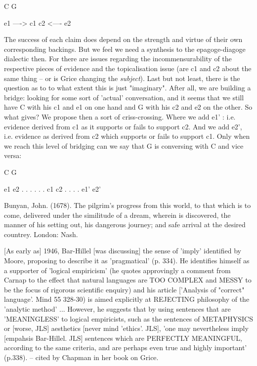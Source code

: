 \documentclass[10pt,titlepage]{book}
\begin{document}
                   C                          G
 
  e1  ---->    c1                          c2  <---- e2
 
 The success of each claim does depend on the strength and virtue of  their 
own corresponding backings. But we feel we need a synthesis to the  
epagoge-diagoge dialectic then. For there are issues regarding the  
incommensurability of the respective pieces of evidence and the topicalisation  issue (are 
c1 and c2 about the same thing -- or is Grice changing the  {\it subject}). 
Last but not least, there is the question as to to what extent this  is just 
"imaginary". After all, we are building a bridge: looking for some sort  of 
'actual' conversation, and it seems that we still have C with his c1 and e1  
on one hand and G with his c2 and e2 on the other. So what gives? We propose  
then a sort of criss-crossing. Where we add e1' : i.e. evidence derived  
from c1 as it supports or fails to support c2. And we add e2', i.e.  evidence 
as derived from c2 which supports or fails to support c1.  Only when we 
reach this level of bridging can we say that G is  conversing with C and vice 
versa:
 
                    C                   G
 
  e1                                                e2
      .                                           .
        .                                     .
           .                               .
                c1                    c2
                   .                      .
                       .               .
                        e1'   e2'
 
 
Bunyan,  John. (1678). The pilgrim's progress from this world,  to that 
which is to come, delivered under  the similitude of a dream, wherein is 
discovered, the manner of his setting out,  his dangerous journey; and safe 
arrival at the desired countrey. London:  Nash.

[As early as] 1946, Bar-Hillel [was discussing] the sense of 'imply'  
identified by Moore, proposing to describe it as 'pragmatical' (p. 334).  He 
identifies himself as a supporter of 'logical empiricism' (he  quotes 
approvingly a comment from Carnap to the effect that  natural languages are TOO 
COMPLEX and MESSY to be the focus of rigorous  scientific enquiry) and his 
article ['Analysis of "correct"  language'. Mind 55 328-30) is aimed explicitly at 
REJECTING philosophy of  the 'analytic method' ... However, he suggests 
that by using sentences that are  'MEANINGLESS' to logical empiricists, such as 
the sentences of METAPHYSICS or  [worse, JLS] aesthetics [never mind 
'ethics'. JLS], 'one may nevertheless  imply [empahsis Bar-Hillel. JLS] 
sentences which are PERFECTLY MEANINGFUL,  according to the same criteria, and are 
perhaps even true and highly important'  (p.338). -- cited by Chapman in her 
book on Grice.
\end{document}
